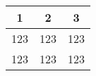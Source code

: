 \documentclass[12pt, a4paper] {article}
\begin{document}
\begin{center}
\begin{tabular}{|| c  c  c ||}
 \hline
 1 & 2 & 3 \\
 \hline\hline
 123 & 123 & 123  \\
 \hline
 123 & 123 & 123  \\
 \hline
\end{tabular}
\end{center}
\end{document}
